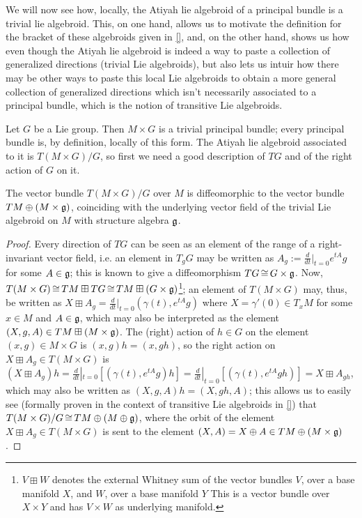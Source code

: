 We will now see how, locally, the Atiyah lie algebroid of a principal bundle is a trivial lie algebroid. This, on one hand, allows us to motivate the definition for the bracket of these algebroids given in \ref{}, and, on the other hand, shows us how even though the Atiyah lie algebroid is indeed a way to paste a collection of generalized directions (trivial Lie algebroids), but also lets us intuir how there may be other ways to paste this local Lie algebroids to obtain a more general collection of generalized directions which isn't necessarily associated to a principal bundle, which is the notion of transitive Lie algebroids.

Let $G$ be a Lie group. Then $M \times G$ is a trivial principal bundle; every principal bundle is, by definition, locally of this form. The Atiyah lie algebroid associated to it is $T(M \times G)/G$, so first we need a good description of $TG$ and of the right action of $G$ on it. 

\begin{proposition}
The vector bundle $T(M \times G)/G$ over $M$ is diffeomorphic to the vector bundle $TM \oplus (M \times \mathfrak{g})$, coinciding with the underlying vector field of the trivial Lie algebroid on $M$ with structure algebra $\mathfrak{g}$.
\end{proposition}

\begin{proof}
Every direction of $TG$ can be seen as an element of the range of a right-invariant vector field, i.e. an element in $T_g G$ may be written as $A_g :=\frac{d}{dt}|_{t=0}e^{tA}g$ for some $A \in \mathfrak{g}$; this is known to give a diffeomorphism $TG \operatorname{\cong} G \times \mathfrak{g}$. Now, $T(M \times G) \operatorname{\cong} TM \boxplus TG \operatorname{\cong} TM \boxplus (G \times \mathfrak{g})$\footnote{$V \boxplus W$ denotes the external Whitney sum of the vector bundles $V$, over a base manifold $X$, and $W$, over a base manifold $Y$ This is a vector bundle over $X \times Y$ and has $V \times W$ as underlying manifold.}; an element of $T(M \times G)$ may, thus, be written as $X \boxplus A_g = \frac{d}{dt}|_{t = 0}(\gamma(t), e^{tA}g)$ where $X = \gamma'(0) \in T_x M$ for some $x \in M$ and $A \in \mathfrak{g}$, which may also be interpreted as the element $(X, g, A) \in TM \boxplus (M \times \mathfrak{g})$. The (right) action of $h \in G$ on the element $(x, g) \in M\times G$ is $(x, g)h = (x, gh)$, so the right action on $X \boxplus A_g \in T(M \times G)$ is $(X \boxplus A_g)h = \frac{d}{dt}|_{t=0}[(\gamma(t), e^{tA}g)h] = \frac{d}{dt}|_{t=0}[(\gamma(t), e^{tA}gh)] = X \boxplus A_{gh}$, which may also be written as $(X, g, A)h = (X, gh, A)$; this allows us to easily see (formally proven in the context of transitive Lie algebroids in \ref{}) that $T(M \times G)/G \operatorname{\cong} TM \oplus (M \oplus \mathfrak{g})$, where the orbit of the element $X \boxplus A_g \in T(M \times G)$ is sent to the element $(X, A) = X \oplus A \in TM \oplus (M \times \mathfrak{g})$.
\end{proof}

